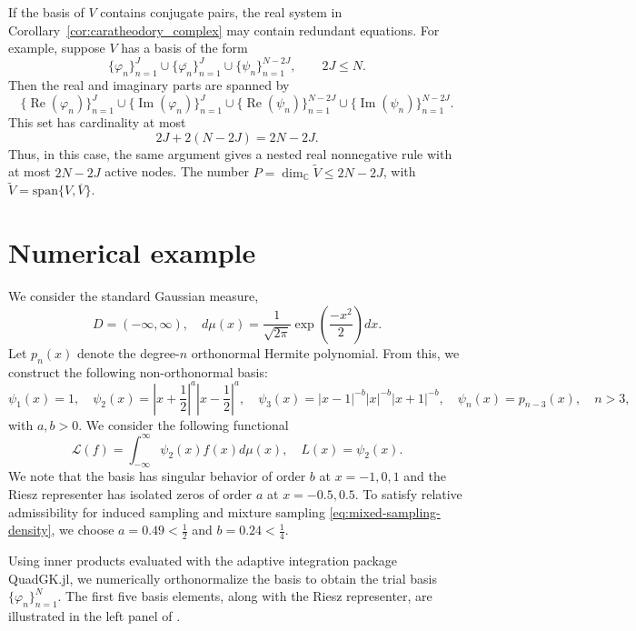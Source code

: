 \documentclass[10pt,dvipsnames]{amsart}
\begin{document}
\begin{remark}
If the basis of \(V\) contains conjugate pairs, the real system in
Corollary~\ref{cor:caratheodory_complex} may contain redundant equations.
For example, suppose \(V\) has a basis of the form
\[
    \{\varphi_n\}_{n=1}^J
    \cup
    \{\overline{\varphi_n}\}_{n=1}^J
    \cup
    \{\psi_n\}_{n=1}^{N-2J},
    \qquad 2J\le N.
\]
Then the real and imaginary parts are spanned by
\[
    \{\operatorname{Re}(\varphi_n)\}_{n=1}^J
    \cup
    \{\operatorname{Im}(\varphi_n)\}_{n=1}^J
    \cup
    \{\operatorname{Re}(\psi_n)\}_{n=1}^{N-2J}
    \cup
    \{\operatorname{Im}(\psi_n)\}_{n=1}^{N-2J}.
\]
This set has cardinality at most
\[
    2J+2(N-2J)=2N-2J.
\]
Thus, in this case, the same argument gives a nested real nonnegative rule
with at most \(2N-2J\) active nodes. The number
\(P=\dim_{\mathbb C}\widetilde V\leq2N-2J\), with
\(\widetilde V=\mathrm{span}\{V,\overline V\}\).
\end{remark}


\section{Numerical example}
\label{sec:numerics}


We consider the standard Gaussian measure,
\[D = (-\infty,\infty),\quad d\mu(x) = \frac{1}{\sqrt{2\pi}}\exp\left(\frac{-x^2}{2}\right)dx.\]
Let $p_n(x)$ denote the degree-$n$ orthonormal Hermite polynomial. From this, we construct the following non-orthonormal basis:
\[
    \psi_1(x) = 1,\quad \psi_2(x) = \left|x+\frac{1}{2}\right|^a \left|x-\frac{1}{2}\right|^a,\quad \psi_3(x) = |x-1|^{-b} |x|^{-b}  |x+1|^{-b} , \quad \psi_{n}(x) = p_{n-3}(x),\quad n > 3,
\]
with $a,b>0$. We consider the following functional
\[\mathcal{L}(f) = \int_{-\infty}^\infty \psi_2(x) f(x) d\mu(x),\quad L(x) = \psi_2(x).\]
We note that the basis has singular behavior of order $b$ at $x=-1,0,1$ and the Riesz representer has isolated zeros of order $a$ at $x=-0.5,0.5$. To satisfy relative admissibility for induced sampling and mixture sampling \eqref{eq:mixed-sampling-density}, we choose $a = 0.49 < \frac{1}{2}$ and $b = 0.24<\frac{1}{4}$.

Using inner products evaluated with the adaptive integration package QuadGK.jl, we numerically orthonormalize the basis to obtain the trial basis \(\{\varphi_n\}_{n=1}^N\). The first five basis elements, along with the Riesz representer, are illustrated in the left panel of .
\end{document}
